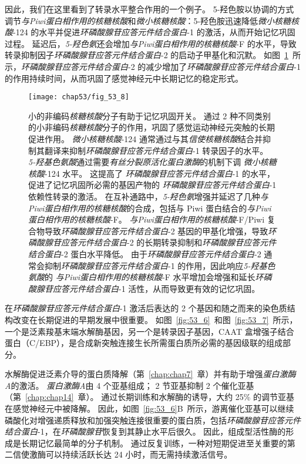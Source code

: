因此，我们在这里看到了转录水平整合作用的一个例子。
5-羟色胺以协调的方式调节\textit{与Piwi蛋白相作用的核糖核酸}和\textit{微小核糖核酸}：5-羟色胺迅速降低\textit{微小核糖核酸}-124 的水平并促进\textit{环磷酸腺苷应答元件结合蛋白}-1 的激活，从而开始记忆巩固过程。
延迟后，\textit{5-羟色氨}还会增加\textit{与Piwi蛋白相作用的核糖核酸}-F 的水平，导致转录抑制因子\textit{环磷酸腺苷应答元件结合蛋白}-2 的启动子甲基化和沉默。
如图~\ref{fig:53_8}~所示，\textit{环磷酸腺苷应答元件结合蛋白}-2 的减少增加了\textit{环磷酸腺苷应答元件结合蛋白}-1 的作用持续时间，从而巩固了感觉神经元中长期记忆的稳定形式。


\begin{figure}[htbp]
	\centering
	\texttt{[image: chap53/fig\_53\_8]}
	\caption{小的非编码\textit{核糖核酸}分子有助于记忆巩固开关。
		通过 2 种不同类别的小非编码\textit{核糖核酸}分子的作用，巩固了感觉运动神经元突触的长期促进作用。
		\textit{微小核糖核酸}-124 通常通过与其\textit{信使核糖核酸}结合并抑制其翻译来抑制\textit{环磷酸腺苷应答元件结合蛋白}-1 转录因子的水平。
		\textit{5-羟基色氨酸}通过需要\textit{有丝分裂原活化蛋白激酶}的机制下调 \textit{微小核糖核酸}-124 水平。
		这提高了 \textit{环磷酸腺苷应答元件结合蛋白}-1 的水平，促进了记忆巩固所必需的基因产物的 \textit{环磷酸腺苷应答元件结合蛋白}-1 依赖性转录的激活。
		在互补通路中，\textit{5-羟色氨}增强并延迟了几种\textit{与Piwi蛋白相作用的核糖核酸}的合成，包括与 Piwi 蛋白结合的\textit{与Piwi蛋白相作用的核糖核酸}-F。
		\textit{与Piwi蛋白相作用的核糖核酸}-F/Piwi 复合物导致\textit{环磷酸腺苷应答元件结合蛋白}-2 基因的甲基化增强，导致\textit{环磷酸腺苷应答元件结合蛋白}-2 的长期转录抑制和\textit{环磷酸腺苷应答元件结合蛋白}-2 蛋白水平降低。
		由于\textit{环磷酸腺苷应答元件结合蛋白}-2 通常会抑制\textit{环磷酸腺苷应答元件结合蛋白}-1 的作用，因此响应\textit{5-羟基色氨酸}的 \textit{与Piwi蛋白相作用的核糖核酸}-F 水平增加会增强和延长\textit{环磷酸腺苷应答元件结合蛋白}-1 活性，从而导致更有效的记忆巩固。}
	\label{fig:53_8}
\end{figure}


在\textit{环磷酸腺苷应答元件结合蛋白}-1 激活后表达的 2 个基因和随之而来的染色质结构改变在长期促进的早期发展中很重要。
如图~\ref{fig:53_6}~和图~\ref{fig:53_7}~所示，一个是泛素羧基末端水解酶基因，另一个是转录因子基因，CAAT 盒增强子结合蛋白（C/EBP），是合成新突触连接生长所需蛋白质所必需的基因级联的组成部分。


水解酶促进泛素介导的蛋白质降解（第~\ref{chap:chap7}~章）并有助于增强\textit{蛋白激酶A}的激活。
\textit{蛋白激酶A}由 4 个亚基组成；
2 节亚基抑制 2 个催化亚基（第~\ref{chap:chap14}~章）。
通过长期训练和水解酶的诱导，大约 25\% 的调节亚基在感觉神经元中被降解。
因此，如图~\ref{fig:53_6}B~所示，游离催化亚基可以继续磷酸化对增强递质释放和加强突触连接很重要的蛋白质，包括\textit{环磷酸腺苷应答元件结合蛋白}-1，在\textit{环磷酸腺苷}恢复到其静止水平后很久。
因此，组成型活性酶的形成是长期记忆最简单的分子机制。
通过反复训练，一种对短期促进至关重要的第二信使激酶可以持续活跃长达 24 小时，而无需持续激活信号。


